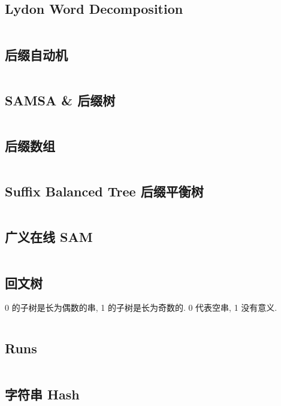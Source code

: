 \documentclass[titlepage, a4paper, 11pt]{article}
\begin{document}
\begin{spacing}{1.15}
				\subsection{Lydon Word Decomposition}
					\inputminted{cpp}{src/String/Lyndon Word.cpp}
				\subsection{后缀自动机}
					\inputminted{cpp}{src/String/SAM.cpp}
				\subsection{SAMSA \& 后缀树}
					\inputminted{cpp}{src/String/SAMSA.cpp}
				\subsection{后缀数组}
					\inputminted{cpp}{src/String/SA.cpp}
				\subsection{Suffix Balanced Tree 后缀平衡树}
					\inputminted{cpp}{src/String/后缀平衡树.cpp}
				\subsection{广义在线 SAM}
				\inputminted{cpp}{src/String/generalizedSAM.cpp}
				\subsection{回文树}
					0 的子树是长为偶数的串, 1 的子树是长为奇数的. 0 代表空串, 1 没有意义.
					\inputminted{cpp}{src/String/PAM.cpp}
				\subsection{Runs}
					\inputminted{cpp}{src/String/Runs.cpp}
				\subsection{字符串 Hash}
				\inputminted{cpp}{src/String/hash.cpp}	

\end{spacing}
\end{document}
